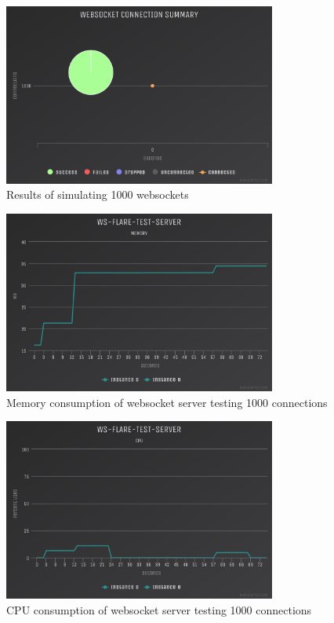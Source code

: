 \begin{figure}[H]
  \centering
    \includegraphics[width=0.8\textwidth]{figures/experiments/experiment-1/node-js/conn-summary-1000.png}
    \caption{Results of simulating 1000 websockets}
    \label{fig:experiment-1-node-conn-summary-1000}
\end{figure}

\begin{figure}[H]
  \centering
    \includegraphics[width=0.8\textwidth]{figures/experiments/experiment-1/node-js/memory-1000.png}
    \caption{Memory consumption of websocket server testing 1000 connections}
    \label{fig:experiment-1-node-memory-1000}
\end{figure}

\begin{figure}[H]
  \centering
    \includegraphics[width=0.8\textwidth]{figures/experiments/experiment-1/node-js/cpu-1000.png}
    \caption{CPU consumption of websocket server testing 1000 connections}
    \label{fig:experiment-1-node-cpu-1000}
\end{figure}

